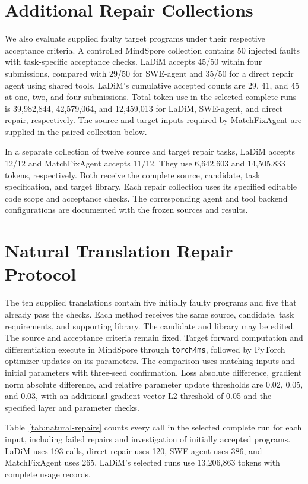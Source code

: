 \section{Additional Repair Collections}
\label{sec:additional-repair}

We also evaluate supplied faulty target programs under their respective acceptance criteria. A controlled MindSpore collection contains 50 injected faults with task-specific acceptance checks. LaDiM accepts 45/50 within four submissions, compared with 29/50 for SWE-agent and 35/50 for a direct repair agent using shared tools. LaDiM's cumulative accepted counts are 29, 41, and 45 at one, two, and four submissions. Total token use in the selected complete runs is 39,982,844, 42,579,064, and 12,459,013 for LaDiM, SWE-agent, and direct repair, respectively. The source and target inputs required by MatchFixAgent are supplied in the paired collection below.

In a separate collection of twelve source and target repair tasks, LaDiM accepts 12/12 and MatchFixAgent accepts 11/12. They use 6,642,603 and 14,505,833 tokens, respectively. Both receive the complete source, candidate, task specification, and target library. Each repair collection uses its specified editable code scope and acceptance checks. The corresponding agent and tool backend configurations are documented with the frozen sources and results.

\section{Natural Translation Repair Protocol}
\label{sec:natural-protocol}

The ten supplied translations contain five initially faulty programs and five that already pass the checks. Each method receives the same source, candidate, task requirements, and supporting library. The candidate and library may be edited. The source and acceptance criteria remain fixed. Target forward computation and differentiation execute in MindSpore through \texttt{torch4ms}, followed by PyTorch optimizer updates on its parameters. The comparison uses matching inputs and initial parameters with three-seed confirmation. Loss absolute difference, gradient norm absolute difference, and relative parameter update thresholds are 0.02, 0.05, and 0.03, with an additional gradient vector L2 threshold of 0.05 and the specified layer and parameter checks.

Table~\ref{tab:natural-repairs} counts every call in the selected complete run for each input, including failed repairs and investigation of initially accepted programs. LaDiM uses 193 calls, direct repair uses 120, SWE-agent uses 386, and MatchFixAgent uses 265. LaDiM's selected runs use 13,206,863 tokens with complete usage records.

